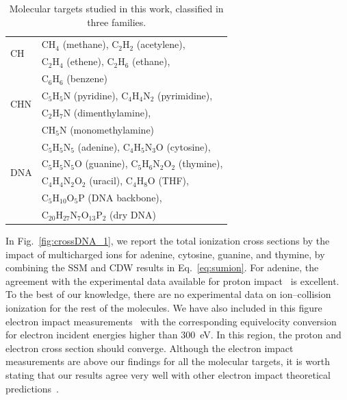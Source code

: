 \documentclass[10pt,showpacs,twocolumn]{revtex4}
\begin{document}
\begin{table}[t]
\begin{center}
\begin{tabular}{|p{}|p{}|}
\hline
\multirow{2}{*}{CH} 
      & CH$_4$ (methane), C$_2$H$_2$ (acetylene),  \\
      & C$_2$H$_4$ (ethene), C$_2$H$_6$ (ethane), \\
      & C$_6$H$_6$ (benzene) \\
\hline
\multirow{2}{*}{CHN} 
      & C$_5$H$_5$N (pyridine), C$_4$H$_4$N$_2$ (pyrimidine), \\ 
      & C$_2$H$_7$N (dimenthylamine), \\
      & CH$_5$N (monomethylamine) \\
\hline
\multirow{4}{*}{DNA} 
      & C$_5$H$_5$N$_5$ (adenine), C$_4$H$_5$N$_3$O (cytosine), \\
      & C$_5$H$_5$N$_5$O (guanine), C$_5$H$_6$N$_2$O$_2$ (thymine), \\
      & C$_4$H$_4$N$_2$O$_2$ (uracil), C$_4$H$_8$O (THF), \\
      & C$_5$H$_{10}$O$_5$P (DNA backbone), \\
      & C$_{20}$H$_{27}$N$_7$O$_{13}$P$_2$ 
(dry DNA) \\
\hline
\end{tabular}
\caption{Molecular targets studied in this work, classified in three 
families.}
\label{tab:families}
\end{center}
\end{table}

In Fig.~\ref{fig:crossDNA_1}, we report the total ionization cross 
sections by the impact of multicharged ions for adenine, cytosine, 
guanine, and thymine, by combining the SSM and CDW results in 
Eq.~\ref{eq:sumion}. For adenine, the agreement with the experimental 
data available for proton impact~\cite{iriki2011} is excellent. To the 
best of our knowledge, there are no experimental data on ion--collision 
ionization for the rest of the molecules. We have also included in this 
figure electron impact measurements~\cite{rahman2016} with the 
corresponding equivelocity conversion for electron incident energies 
higher than 300~eV. In this region, the proton and electron cross 
section should converge. Although the electron impact measurements are 
above our findings for all the molecular targets, it is worth stating 
that our results agree very well with other electron impact theoretical 
predictions~\cite{mozejko2003,tan2018}. 
\end{document}
